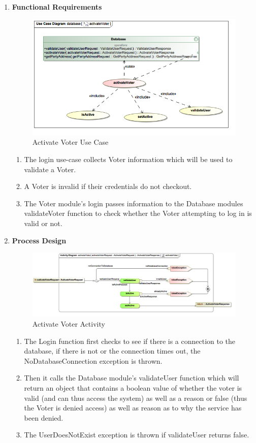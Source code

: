 \begin{enumerate}
\begin{enumerate}
			\item \textbf{Functional Requirements}
			\begin{figure}[H]
				\centering
				\includegraphics[width=0.75\linewidth]{../Images/Database/UseCases/ActivateVoter_UseCase.png}
				\caption{Activate Voter Use Case}
			\end{figure}
			
			\begin{enumerate}
				\item The login use-case collects Voter information which will be used to validate a Voter. 
				\item A Voter is invalid if their credentials do not checkout. 
				\item The Voter module's login passes information to the Database modules validateVoter function to check whether the Voter attempting to log in is valid or not.  
			\end{enumerate}
			
		
			
			\item \textbf{Process Design}
			\begin{figure}[H]
				\centering
				\includegraphics[width=0.75\linewidth]{../Images/Database/Activity/ActivateVoter_Activity.png}
				\caption{Activate Voter Activity}
			\end{figure}
			
			
			\begin{enumerate}
				\item The Login function first checks to see if there is a connection to the database, if there is not or the connection times out, the NoDatabaseConnection exception is thrown.
				\item Then it calls the Database module's validateUser function which will return an object that contains a boolean value of whether the voter is valid (and can thus access the system) as well as a reason or false (thus the Voter is denied access) as well as reason as to why the service has been denied. 
				\item The UserDoesNotExist exception is thrown if validateUser returns false. 
			\end{enumerate}			
		\end{enumerate}
\end{enumerate}
